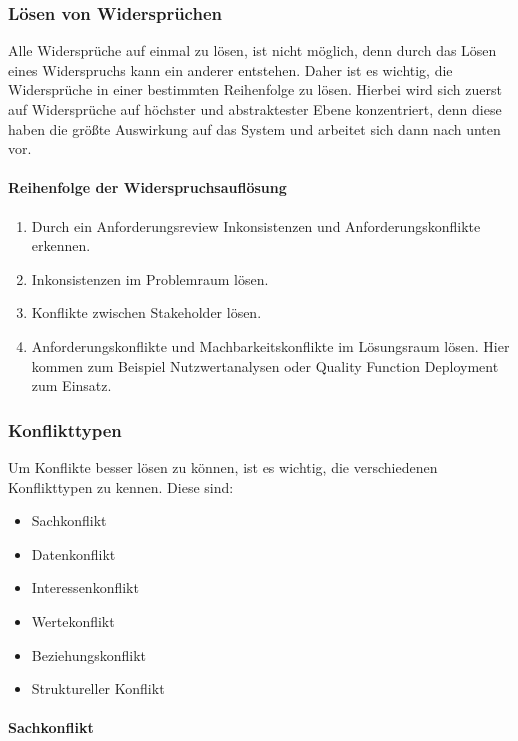 \subsubsection{Lösen von Widersprüchen}\label{subsubsec:loesen}
Alle Widersprüche auf einmal zu lösen, ist nicht möglich,
denn durch das Lösen eines Widerspruchs kann ein anderer entstehen.
Daher ist es wichtig, die Widersprüche in einer bestimmten Reihenfolge zu lösen.
Hierbei wird sich zuerst auf Widersprüche auf höchster und abstraktester Ebene konzentriert,
denn diese haben die größte Auswirkung auf das System und arbeitet sich dann nach unten vor.

\paragraph{Reihenfolge der Widerspruchsauflösung}
\begin{enumerate}
    \item Durch ein Anforderungsreview Inkonsistenzen und Anforderungskonflikte erkennen.
    \item Inkonsistenzen im Problemraum lösen.
    \item Konflikte zwischen Stakeholder lösen.
    \item Anforderungskonflikte und Machbarkeitskonflikte im Lösungsraum lösen.
    Hier kommen zum Beispiel Nutzwertanalysen oder Quality Function Deployment zum Einsatz.
\end{enumerate}\autocite[vgl.][S.237f]{Herrmann.2022}

\subsubsection{Konflikttypen}
Um Konflikte besser lösen zu können, ist es wichtig, die verschiedenen Konflikttypen zu kennen.
Diese sind:
\begin{itemize}
    \item Sachkonflikt
    \item Datenkonflikt
    \item Interessenkonflikt
    \item Wertekonflikt
    \item Beziehungskonflikt
    \item Struktureller Konflikt
\end{itemize}\autocite[vgl.][S.137]{Pohl.2021}

\paragraph{Sachkonflikt}
~\autocite[][S.138]{Pohl.2021}

